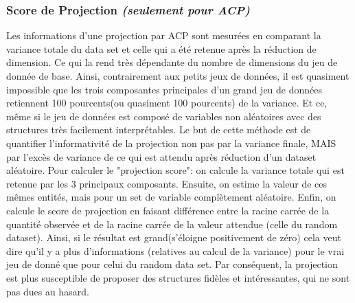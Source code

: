 \subsubsection{Score de Projection \textit{(seulement pour ACP)}}
Les informations d’une projection par ACP sont mesurées en comparant la variance totale du data set et celle qui a été retenue après la réduction de dimension. Ce qui la rend très dépendante du nombre de dimensions du jeu de donnée de base.\newline
Ainsi, contrairement aux petits jeux de données, il est quasiment impossible que les trois composantes principales d’un grand jeu de données retiennent 100 pourcents(ou quasiment 100 pourcents) de la variance. Et ce, même si le jeu de données est composé de variables non aléatoires avec des structures très facilement interprétables.
\smallskip
Le but de cette méthode est de quantifier l’informativité de la projection non pas par la variance finale, MAIS par l'excès de variance de ce qui est attendu après réduction d’un dataset aléatoire.
Pour calculer le "projection score": on calcule la variance totale qui est retenue par les 3 principaux composants. Ensuite, on estime la valeur de ces mêmes entités, mais pour un set de variable complètement aléatoire.\newline
Enfin, on calcule le score de projection en faisant différence entre la racine carrée de la quantité observée et de la racine carrée de la valeur attendue (celle du random dataset).  Ainsi, si le résultat est grand(s’éloigne positivement de zéro) cela veut dire qu’il y a plus d’informations (relatives au calcul de la variance) pour le vrai jeu de donné que pour celui du random data set.
Par conséquent, la projection est plus susceptible de proposer des structures fidèles et intéressantes, qui ne sont pas dues au hasard\cite{fontes2011ProjectionScore}.




